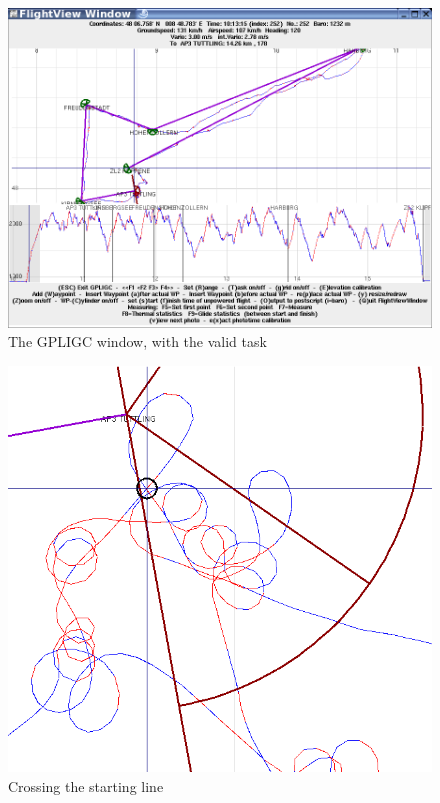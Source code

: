 \begin{figure}[h]
\caption{\label{flightview2}The GPLIGC window, with the valid task}
\begin{center}
\includegraphics[width=\textwidth]{png/flightview-2}
\end{center}
\end{figure}

\begin{figure}[h]
\caption{\label{start}Crossing the starting line}
\begin{center}
\includegraphics[width=\textwidth]{png/start}
\end{center}
\end{figure}

